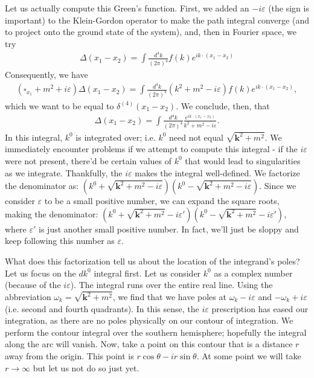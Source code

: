 \documentclass{../mathnotes}
\begin{document}
Let us actually compute this Green's function. First, we added an $-i\varepsilon$ (the sign is important) to the Klein-Gordon operator to
make the path integral converge (and to project onto the ground state of the system), and, then in Fourier space, we try
\begin{align*}
    \Delta(x_1-x_2)=\int \frac{d^4k}{(2\pi)^4}f(k)e^{ik\cdot (x_1-x_2)}
\end{align*}
Consequently, we have
\begin{align*}
    \left( \square_{x_1}+m^2+i\varepsilon \right)\Delta(x_1-x_2)=\int \frac{d^4k}{(2\pi)^4}(k^2+m^2-i\varepsilon)f(k)e^{ik\cdot (x_1-x_2)},
\end{align*}
which we want to be equal to $\delta^{(4)}(x_1-x_2)$. We conclude, then, that
\begin{align*}
    \Delta(x_1-x_2)=\int\frac{d^4k}{(2\pi)^4}\frac{e^{ik\cdot(x_1-x_2)}}{k^2+m^2-i\varepsilon}.
\end{align*}
In this integral, $k^0$ is integrated over; i.e. $k^0$ need not equal $\sqrt{\mathbf{k}^2+m^2}$. We immediately encounter problems if
we attempt to compute this integral - if the $i\varepsilon$ were not present, there'd be certain values of $k^0$ that would lead
to singularities as we integrate. Thankfully, the $i\varepsilon$ makes the integral well-defined. We factorize the denominator as:
$\left( k^0+\sqrt{\mathbf{k}^2+m^2-i\varepsilon} \right)\left( k^0-\sqrt{\mathbf{k}^2+m^2-i\varepsilon} \right)$. Since we consider $\varepsilon$
to be a small positive number, we can expand the square roots, making the denominator:
$\left( k^0+\sqrt{\mathbf{k}^2+m^2}-i\varepsilon' \right)\left( k^0-\sqrt{\mathbf{k}^2+m^2}-i\varepsilon' \right)$,
where $\varepsilon'$ is just another small positive number. In fact, we'll just be sloppy and keep following this number as $\varepsilon$.

What does this factorization tell us about the location of the integrand's poles? Let us focus on the $dk^0$ integral first. Let us consider $k^0$ as
a complex number (because of the $i\varepsilon$). The integral runs over the entire real line. Using the abbreviation $\omega_k=\sqrt{\mathbf{k}^2+m^2}$,
we find that we have poles at $\omega_k-i\varepsilon$ and $-\omega_k+i\varepsilon$ (i.e. second and fourth quadrants). In this sense, the
$i\varepsilon$ prescription has eased our integration, as there are no poles physically on our contour of integration. We perform the contour integral
over the southern hemisphere; hopefully the integral along the arc will vanish. Now, take a point on this contour that is a distance $r$ away from the origin.
This point is $r\cos\theta-ir\sin\theta$. At some point we will take $r\to\infty$ but let us not do so just yet.
\end{document}
